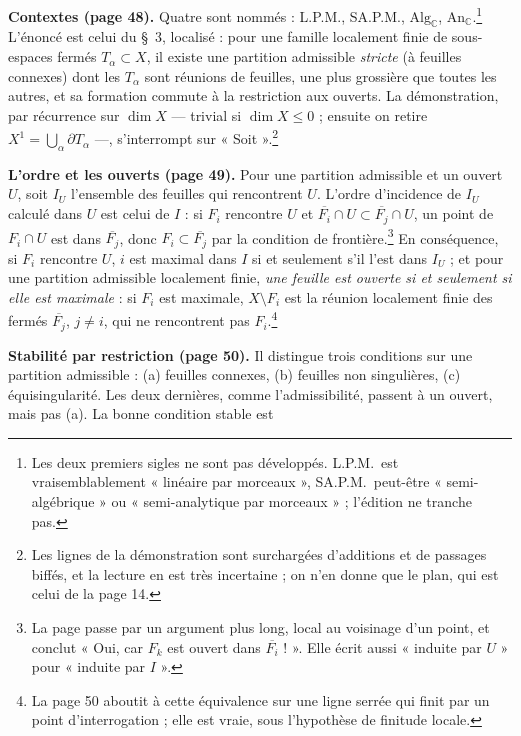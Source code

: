 \documentclass[11pt,a4paper]{article}
\begin{document}
\textbf{Contextes (page 48).} Quatre sont nommés : L.P.M., SA.P.M.,
$\mathrm{Alg}_{\mathbb{C}}$, $\mathrm{An}_{\mathbb{C}}$.\footnote{Les deux
premiers sigles ne sont pas développés. L.P.M.\ est vraisemblablement
« linéaire par morceaux », SA.P.M.\ peut-être « semi-algébrique » ou
« semi-analytique par morceaux » ; l'édition ne tranche pas.} L'énoncé est
celui du §~3, localisé : pour une famille localement finie de sous-espaces
fermés $T_\alpha \subset X$, il existe une partition admissible \emph{stricte}
(à feuilles connexes) dont les $T_\alpha$ sont réunions de feuilles, une plus
grossière que toutes les autres, et sa formation commute à la restriction aux
ouverts. La démonstration, par récurrence sur $\dim X$ — trivial si $\dim X
\leqslant 0$ ; ensuite on retire $X^1 = \bigcup_\alpha \partial T_\alpha$ —,
s'interrompt sur « Soit ».\footnote{Les lignes de la démonstration sont
surchargées d'additions et de passages biffés, et la lecture en est très
incertaine ; on n'en donne que le plan, qui est celui de la page 14.}

\textbf{L'ordre et les ouverts (page 49).} Pour une partition admissible et un
ouvert $U$, soit $I_U$ l'ensemble des feuilles qui rencontrent $U$. L'ordre
d'incidence de $I_U$ calculé dans $U$ est celui de $I$ : si $F_i$ rencontre
$U$ et $\overline{F_i} \cap U \subset \overline{F_j} \cap U$, un point de
$F_i \cap U$ est dans $\overline{F_j}$, donc $F_i \subset \overline{F_j}$ par la
condition de frontière.\footnote{La page passe par un argument plus long,
local au voisinage d'un point, et conclut « Oui, car $F_k$ est ouvert dans
$\overline{F_i}$ ! ». Elle écrit aussi « induite par $U$ » pour « induite par
$I$ ».} En conséquence, si $F_i$ rencontre $U$, $i$ est maximal dans $I$ si et
seulement s'il l'est dans $I_U$ ; et pour une partition admissible localement
finie, \emph{une feuille est ouverte si et seulement si elle est maximale} :
si $F_i$ est maximale, $X \setminus F_i$ est la réunion localement finie des
fermés $\overline{F_j}$, $j \neq i$, qui ne rencontrent pas $F_i$.\footnote{La
page 50 aboutit à cette équivalence sur une ligne serrée qui finit par un
point d'interrogation ; elle est vraie, sous l'hypothèse de finitude locale.}

\textbf{Stabilité par restriction (page 50).} Il distingue trois conditions sur
une partition admissible : (a) feuilles connexes, (b) feuilles non singulières,
(c) équisingularité. Les deux dernières, comme l'admissibilité, passent à un
ouvert, mais pas (a). La bonne condition stable est
\end{document}
